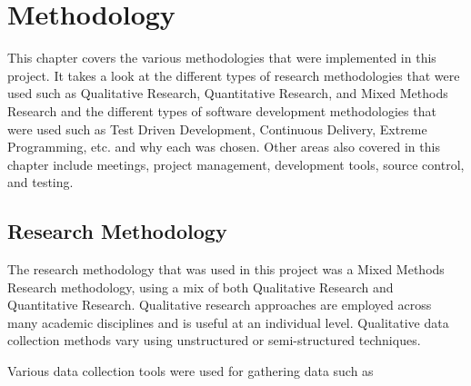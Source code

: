 \chapter{Methodology}
This chapter covers the various methodologies that were implemented in this 
project. It takes a look at the different types of research methodologies that 
were used such as Qualitative Research, Quantitative Research, and Mixed Methods
Research and the different types of software development methodologies that were
used such as Test Driven Development, Continuous Delivery, Extreme Programming, 
etc. and why each was chosen. Other areas also covered in this chapter include
meetings, project management, development tools, source control, and testing.

\section{Research Methodology}
The research methodology that was used in this project was a Mixed Methods 
Research methodology, using a mix of both Qualitative Research and Quantitative 
Research. Qualitative research approaches are employed across many academic 
disciplines and is useful at an individual level. Qualitative data collection
methods vary using unstructured or semi-structured techniques.
\par
\medskip
Various data collection tools were used for gathering data such as

\newpage
